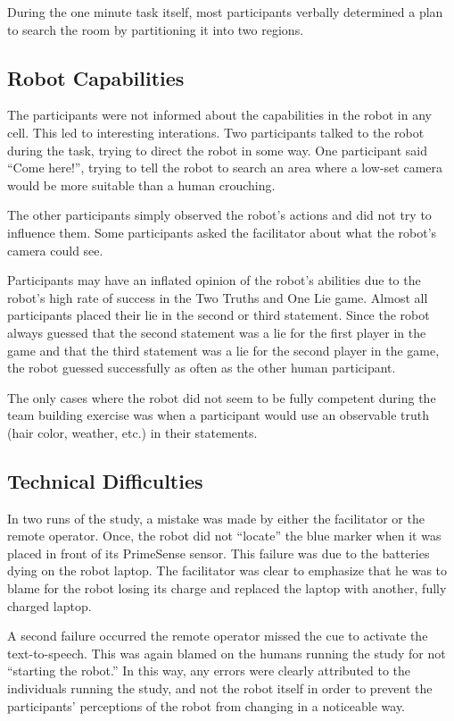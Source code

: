 \documentclass{acm_proc_article-sp}
\begin{document}
During the one minute task itself, most participants verbally determined a plan to search the room by partitioning it into two regions. 

\subsection{Robot Capabilities}
\label{subsection:robot-capabilities}
The participants were not informed about the capabilities in the robot in any cell. This led to interesting interations. Two participants talked to the robot during the task, trying to direct the robot in some way. One participant said ``Come here!'', trying to tell the robot to search an area where a low-set camera would be more suitable than a human crouching. 

The other participants simply observed the robot's actions and did not try to influence them. Some participants asked the facilitator about what the robot's camera could see.

Participants may have an inflated opinion of the robot's abilities due to the robot's high rate of success in the Two Truths and One Lie game. Almost all participants placed their lie in the second or third statement. Since the robot always guessed that the second statement was a lie for the first player in the game and that the third statement was a lie for the second player in the game, the robot guessed successfully as often as the other human participant. 

The only cases where the robot did not seem to be fully competent during the team building exercise was when a participant would use an observable truth (hair color, weather, etc.) in their statements. 

\subsection{Technical Difficulties}
\label{subsection:technical-difficulties}
In two runs of the study, a mistake was made by either the facilitator or the remote operator. Once, the robot did not ``locate'' the blue marker when it was placed in front of its PrimeSense sensor. This failure was due to the batteries dying on the robot laptop. The facilitator was clear to emphasize that he was to blame for the robot losing its charge and replaced the laptop with another, fully charged laptop. 

A second failure occurred the remote operator missed the cue to activate the text-to-speech. This was again blamed on the humans running the study for not ``starting the robot.'' In this way, any errors were clearly attributed to the individuals running the study, and not the robot itself in order to prevent the participants' perceptions of the robot from changing in a noticeable way. 
\end{document}
